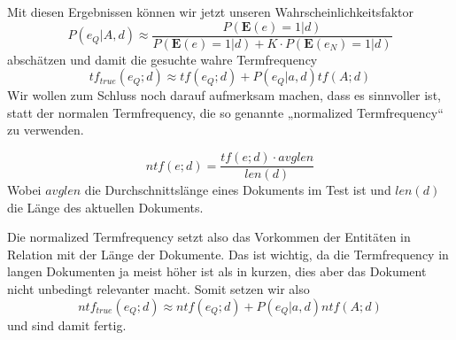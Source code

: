 Mit diesen Ergebnissen können wir jetzt unseren Wahrscheinlichkeitsfaktor 
\[P(e_Q | A,d) \approx \frac{P(\textbf{E}(e) = 1 | d)}{P(\textbf{E}(e) = 1 | d) + K \cdot P(\textbf{E}(e_N) = 1 | d)} \]
abschätzen und damit die gesuchte wahre Termfrequency
\[ tf_{true}(e_Q;d) \approx tf(e_Q;d) + P(e_Q|a,d)tf(A;d) \]
Wir wollen zum Schluss noch darauf aufmerksam machen, dass es sinnvoller ist, statt der normalen Termfrequency, die so genannte „normalized Termfrequency“ zu verwenden.\\
\begin{defi}
\[ ntf(e;d) = \frac{tf(e;d) \cdot avglen}{len(d)} \]
Wobei $avglen$ die Durchschnittslänge eines Dokuments im Test ist und $len(d)$ die Länge des aktuellen Dokuments.
\end{defi}
Die normalized Termfrequency setzt also das Vorkommen der Entitäten in Relation mit der Länge der Dokumente. Das ist wichtig, da die Termfrequency in langen Dokumenten ja meist höher ist als in kurzen, dies aber das Dokument nicht unbedingt relevanter macht.
Somit setzen wir also
\[ ntf_{true}(e_Q;d) \approx ntf(e_Q;d) + P(e_Q|a,d)ntf(A;d) \]
und sind damit fertig.
